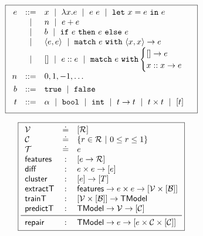 \begin{figure}
\small
\centering
\begin{minipage}[c]{\linewidth}
  \[
  \boxed{
  \begin{array}{rcl}
  e & ::=    & x \ \mid\  \lambda x. e \ \mid\  e\ e \ \mid\  \mathtt{let}\ x = e\ \mathtt{in}\ e \\
    & \ \mid\  & n \ \mid\  e + e\\
    & \ \mid\  & b \ \mid\  \mathtt{if}\ e\ \mathtt{then}\ e\ \mathtt{else}\ e \\
    & \ \mid\  & \langle e, e \rangle \ \mid\  \mathtt{match}\ e\ \mathtt{with}\ \langle x, x \rangle \to e \\
    & \ \mid\  & \mathtt{[]} \ \mid\  e :: e \ \mid\  \mathtt{match}\ e\ \mathtt{with} \begin{cases} \mathtt{[]} \to e\\ x :: x \to e \end{cases} \\[0.05in]

  n & ::= &  0, 1, -1, \ldots \\[0.05in]

  b & ::= &  \mathtt{true} \ \mid\  \mathtt{false} \\[0.05in]

  t & ::= & \alpha \ \mid\  \mathtt{bool} \ \mid\  \mathtt{int} \ \mid\  t \to t \ \mid\  t \times t \ \mid\  [t] \\[0.05in]
  \end{array}
  }
  \]
  \label{fig:syntax}
\end{minipage}
\begin{minipage}[c]{\linewidth}
  \lstDeleteShortInline{|} %
  \[
  \boxed{
  \begin{array}{lcl}
    \V           & \defeq & \List{\R}\\
    \Runit       & \defeq & \{r \in \R\ |\ 0 \le r \le 1\} \\ %
    \T           & \defeq & e\\
    \featuresym  & : & \List{e \to \R} \\
    \diffsym     & : & e \times e \to \List{e} \\
    \clustersym  & : & \List{e} \to \List{T}\\
    \extractTsym & : & \featuresym \to e \times e \to \List{\V \times \List{\B}} \\
    \trainTsym   & : & \List{\V \times \List{\B}} \to \ModelT \\
    \predictTsym & : & \ModelT \to \V \to \List{\Runit} \\
    \midrule
    \repairsym   & : & \ModelT \to e \to \List{e \times \Runit \times \List{\Runit}}
  \end{array}
  }
  \]
  \lstMakeShortInline{|}
  \label{fig:api}
\end{minipage}
\end{figure}
